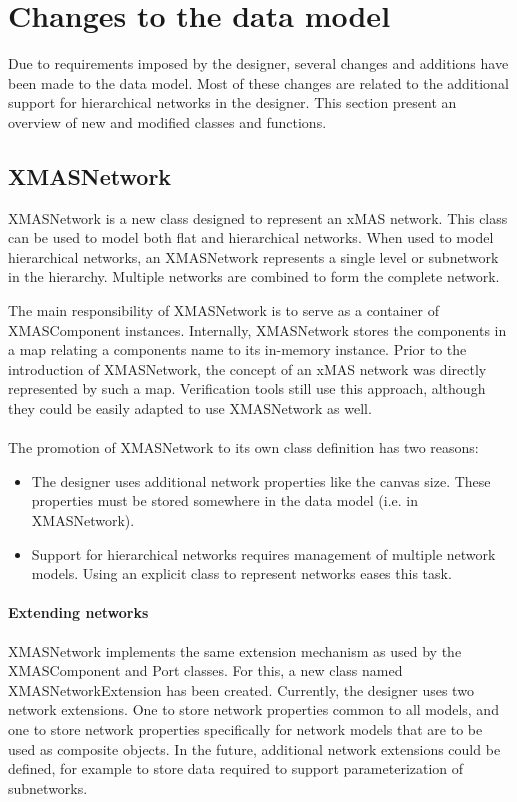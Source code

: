 \section{Changes to the data model}

Due to requirements imposed by the designer, several changes and additions have
been made to the data model. Most of these changes are related to the additional
support for hierarchical networks in the designer. This section present an overview
of new and modified classes and functions.

\subsection{XMASNetwork}

XMASNetwork is a new class designed to represent an xMAS network. This class can be
used to model both flat and hierarchical networks. When used to model hierarchical
networks, an XMASNetwork represents a single level or subnetwork in the hierarchy.
Multiple networks are combined to form the complete network.

The main responsibility of XMASNetwork is to serve as a container of XMASComponent
instances. Internally, XMASNetwork stores the components in a map relating a
components name to its in-memory instance. Prior to the introduction of XMASNetwork,
the concept of an xMAS network was directly represented by such a map. Verification
tools still use this approach, although they could be easily adapted to use
XMASNetwork as well.

\paragraph{}
The promotion of XMASNetwork to its own class definition has two reasons:
\begin{itemize}
 \item The designer uses additional network properties like the canvas size. These
 properties must be stored somewhere in the data model (i.e. in XMASNetwork).
 \item Support for hierarchical networks requires management of multiple network
 models. Using an explicit class to represent networks eases this task.
\end{itemize}

\paragraph{Extending networks}
XMASNetwork implements the same extension mechanism as used by the XMASComponent and
Port classes. For this, a new class named XMASNetworkExtension has been created.
Currently, the designer uses two network extensions. One to store network
properties common to all models, and one to store network properties specifically
for network models that are to be used as composite objects.
In the future, additional network extensions could be defined, for example to store
data required to support parameterization of subnetworks.

